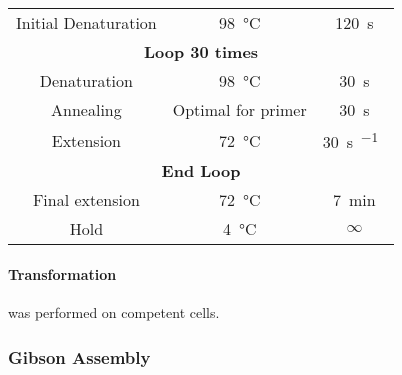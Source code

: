 \documentclass[../main.tex]{subfiles}
\begin{document}
\begin{center}
\begin{tabular}{ccc}
Initial Denaturation	& \SI{98}{\degreeCelsius} & \SI{120}{\second}\\
\multicolumn{3}{c}{\textbf{Loop 30 times}}\\
Denaturation		&	\SI{98}{\degreeCelsius}		&	\SI{30}{\second}\\
Annealing 		&	Optimal for primer	&	\SI{30}{\second}\\
Extension		&	\SI{72}{\degreeCelsius}		&	\SI{30}{\second\per\kilo\base}\\
\multicolumn{3}{c}{\textbf{End Loop}}\\
Final extension	&	\SI{72}{\degreeCelsius}		&	\SI{7}{\minute}\\
Hold				&	\SI{4}{\degreeCelsius}		&	\(\infty\)
\end{tabular}
\end{center}

\paragraph{Transformation} was performed on  competent cells.

\subsubsection{Gibson Assembly}
\end{document}
